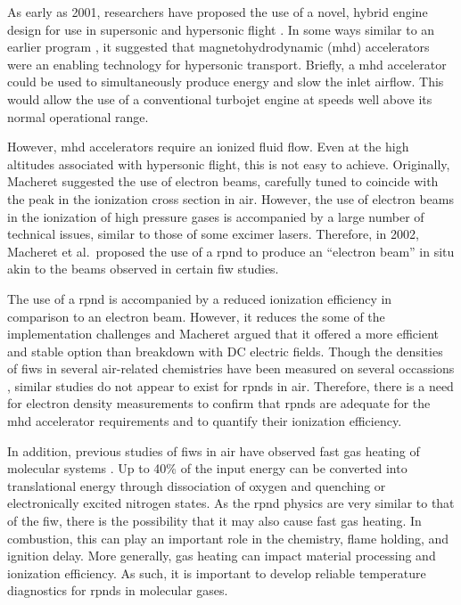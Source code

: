 As early as 2001, researchers have proposed the use of a novel, hybrid engine
design for use in supersonic and hypersonic flight \cite{Macheret2001}. In some
ways similar to an earlier program \cite{Gurijanov1996}, it suggested that
magnetohydrodynamic (\acs{mhd}) accelerators were an enabling technology for
hypersonic transport. Briefly, a \acs{mhd} accelerator could be used to
simultaneously produce energy and slow the inlet airflow. This would allow the
use of a conventional turbojet engine at speeds well above its normal
operational range.

However, \acs{mhd} accelerators require an ionized fluid flow. Even at the high
altitudes associated with hypersonic flight, this is not easy to achieve.
Originally, Macheret suggested the use of electron beams, carefully tuned to
coincide with the peak in the ionization cross section in air. However, the use
of electron beams in the ionization of high pressure gases is accompanied by a
large number of technical issues, similar to those of some excimer lasers.
Therefore, in 2002, Macheret et al.\ proposed the use of a \acs{rpnd} to produce
an ``electron beam'' in situ \cite{Macheret2002} akin to the beams observed in
certain \acs{fiw} studies.

The use of a \acs{rpnd} is accompanied by a reduced ionization efficiency in
comparison to an electron beam. However, it reduces the some of the
implementation challenges and Macheret argued that it offered a more efficient
and stable option than breakdown with DC electric fields. Though the densities
of \acs{fiw}s in several air-related chemistries have been measured on several
occassions \cite{Anikin1998, Aleksandrov2007, Aleksandrov2008,
Starikovskaia2006}, similar studies do not appear to exist for \acs{rpnd}s in
air. Therefore, there is a need for electron density measurements to confirm
that \acs{rpnd}s are adequate for the \acs{mhd} accelerator requirements and to
quantify their ionization efficiency.

In addition, previous studies of \acs{fiw}s in air have observed fast gas
heating of molecular systems \cite{Popov2011}. Up to 40\% of the input energy
can be converted into translational energy through dissociation of oxygen and
quenching or electronically excited nitrogen states. As the \acs{rpnd} physics
are very similar to that of the \acs{fiw}, there is the possibility that it may
also cause fast gas heating. In combustion, this can play an important role in
the chemistry, flame holding, and ignition delay. More generally, gas heating
can impact material processing and ionization efficiency. As such, it is
important to develop reliable temperature diagnostics for \acs{rpnd}s in
molecular gases.

